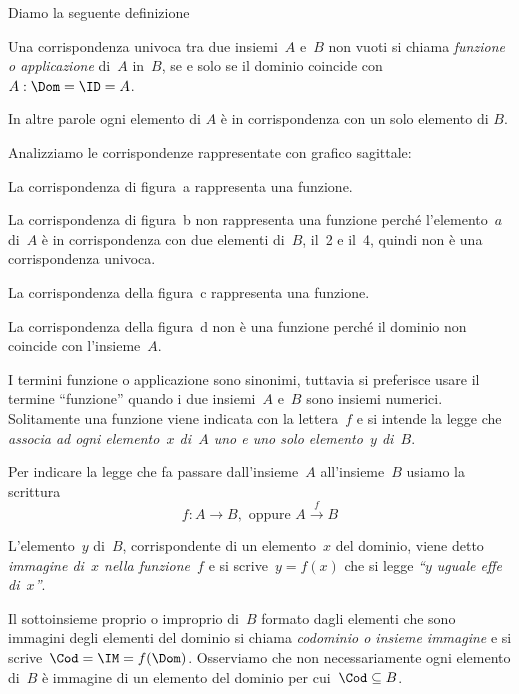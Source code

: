 Diamo la seguente definizione

\begin{definizione}
 Una corrispondenza univoca tra due insiemi~$A$ e~$B$ non vuoti
si chiama \emph{funzione o applicazione} di~$A$ in~$B$, se e solo se il dominio 
coincide con~$A: \Dom = \ID = A$.
\end{definizione}
In altre parole ogni elemento di $A$ è in corrispondenza con un solo elemento di 
$B$.
\begin{exrig}
 \begin{esempio}
\label{ex:D.1}
Analizziamo le corrispondenze rappresentate con grafico sagittale:
 \begin{center}
  
 \end{center}

La corrispondenza di figura~a rappresenta una funzione.

La corrispondenza di figura~b non rappresenta una funzione perché
l'elemento~$a$ di~$A$ è in corrispondenza con due
elementi di~$B$, il~2 e il~4, quindi non è una corrispondenza univoca.

La corrispondenza della figura~c rappresenta una funzione.

La corrispondenza della figura~d non è una funzione perché il
dominio non coincide con l'insieme~$A$.
 \end{esempio}

\end{exrig}

I termini funzione o applicazione sono sinonimi, tuttavia si preferisce
usare il termine ``funzione'' quando i due insiemi~$A$ e~$B$ sono insiemi 
numerici. Solitamente una funzione
viene indicata con la lettera~$f$ e si intende la legge
che \emph{associa ad ogni elemento~$x$ di~$A$ uno e uno solo elemento~$y$ 
di~$B$}.

Per indicare la legge che fa passare dall'insieme~$A$ all'insieme~$B$ usiamo la 
scrittura
\begin{equation*}
f:A \rightarrow B,\text{ oppure } A\overset{{f}}{{\rightarrow }}B
\end{equation*}

\begin{definizione}
 L'elemento~$y$ di~$B$, corrispondente di un elemento~$x$ del dominio, viene 
detto \emph{immagine di~$x$ nella funzione~$f$} e
si scrive~$y = f(x)$ che si legge \emph{``$y$ uguale effe di~$x$''}.
\end{definizione}


Il sottoinsieme proprio o improprio di~$B$ formato dagli elementi che sono
immagini degli elementi del dominio si chiama
\emph{codominio o insieme immagine} e si scrive~$\Cod = \IM = f(\Dom)$. 
Osserviamo che non necessariamente
ogni elemento di~$B$ è immagine di un elemento del dominio per 
cui~$\Cod\subseteq B$.

